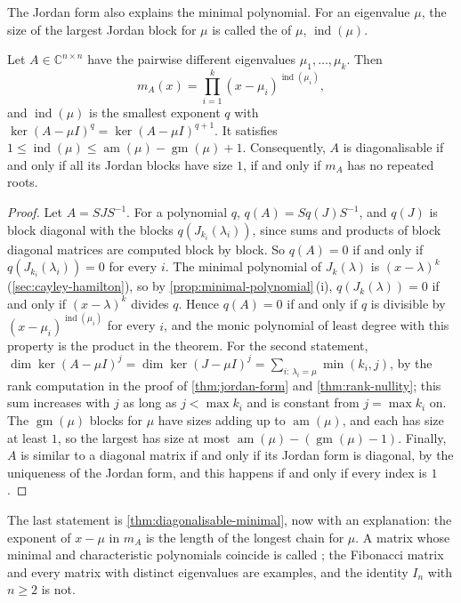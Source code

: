 The Jordan form also explains the minimal polynomial. For an eigenvalue $\mu$, the size of the largest Jordan block for $\mu$ is called the  of $\mu$, $\operatorname{ind}(\mu)$.

\begin{theorem}
\label{thm:jordan-minimal}
Let $A\in\mathbb C^{n\times n}$ have the pairwise different eigenvalues $\mu_1,\ldots,\mu_k$. Then
\[
m_A(x)=\prod_{i=1}^k(x-\mu_i)^{\operatorname{ind}(\mu_i)} ,
\]
and $\operatorname{ind}(\mu)$ is the smallest exponent $q$ with $\ker(A-\mu I)^q=\ker(A-\mu I)^{q+1}$. It satisfies $1\le\operatorname{ind}(\mu)\le\operatorname{am}(\mu)-\operatorname{gm}(\mu)+1$. Consequently, $A$ is diagonalisable if and only if all its Jordan blocks have size $1$, if and only if $m_A$ has no repeated roots.
\end{theorem}

\begin{proof}
Let $A=SJS^{-1}$. For a polynomial $q$, $q(A)=Sq(J)S^{-1}$, and $q(J)$ is block diagonal with the blocks $q(J_{k_i}(\lambda_i))$, since sums and products of block diagonal matrices are computed block by block. So $q(A)=0$ if and only if $q(J_{k_i}(\lambda_i))=0$ for every $i$. The minimal polynomial of $J_k(\lambda)$ is $(x-\lambda)^k$ (\cref{sec:cayley-hamilton}), so by \cref{prop:minimal-polynomial}\,(i), $q(J_k(\lambda))=0$ if and only if $(x-\lambda)^k$ divides $q$. Hence $q(A)=0$ if and only if $q$ is divisible by $(x-\mu_i)^{\operatorname{ind}(\mu_i)}$ for every $i$, and the monic polynomial of least degree with this property is the product in the theorem. For the second statement, $\dim\ker(A-\mu I)^j=\dim\ker(J-\mu I)^j=\sum_{i:\,\lambda_i=\mu}\min(k_i,j)$, by the rank computation in the proof of \cref{thm:jordan-form} and \cref{thm:rank-nullity}; this sum increases with $j$ as long as $j<\max k_i$ and is constant from $j=\max k_i$ on. The $\operatorname{gm}(\mu)$ blocks for $\mu$ have sizes adding up to $\operatorname{am}(\mu)$, and each has size at least $1$, so the largest has size at most $\operatorname{am}(\mu)-(\operatorname{gm}(\mu)-1)$. Finally, $A$ is similar to a diagonal matrix if and only if its Jordan form is diagonal, by the uniqueness of the Jordan form, and this happens if and only if every index is $1$.
\end{proof}

The last statement is \cref{thm:diagonalisable-minimal}, now with an explanation: the exponent of $x-\mu$ in $m_A$ is the length of the longest chain for $\mu$. A matrix whose minimal and characteristic polynomials coincide is called ; the Fibonacci matrix and every matrix with distinct eigenvalues are examples, and the identity $I_n$ with $n\ge2$ is not.

